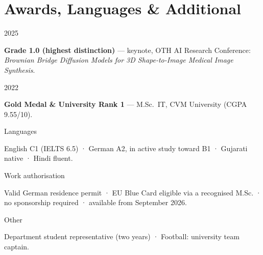 \documentclass[10pt,a4paper]{article}
\newlength{\cvleft}\setlength{\cvleft}{30mm}
\newlength{\cvgap}\setlength{\cvgap}{5mm}
\newcommand{\cvrow}[2]{%
  \noindent\begin{minipage}[t]{\cvleft}\raggedright\strut #1\end{minipage}%
  \hspace{\cvgap}%
  \begin{minipage}[t]{\dimexpr\textwidth-\cvleft-\cvgap\relax}\strut #2\end{minipage}%
  \par\vspace{4.5pt}}
\newcommand{\dates}[1]{\sansfont\fontsize{9}{11}\selectfont\color{mid}#1}
\begin{document}
\section{Awards, Languages \& Additional}
\cvrow{\dates{2025}}{%
\textbf{Grade 1.0 (highest distinction)} — keynote, OTH AI Research Conference: \textit{Brownian Bridge Diffusion Models for 3D Shape-to-Image Medical Image Synthesis}. }
\cvrow{\dates{2022}}{%
\textbf{Gold Medal \& University Rank 1} — M.Sc.\ IT, CVM University (CGPA 9.55/10). }
\cvrow{\dates{Languages}}{%
English C1 (IELTS 6.5) · German A2, in active study toward B1 · Gujarati native · Hindi fluent. }
\cvrow{\dates{Work authorisation}}{%
Valid German residence permit · EU Blue Card eligible via a recognised M.Sc. · no sponsorship required · available from September 2026. }
\cvrow{\dates{Other}}{%
Department student representative (two years) · Football: university team captain.}
\end{document}

